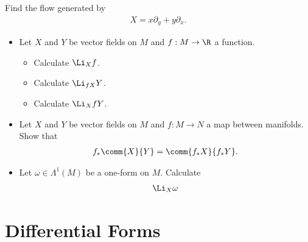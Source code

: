 \begin{Ebox}
  Find the flow generated by
  \begin{align}
    X = x\partial_y +y\partial_x.
  \end{align}
\end{Ebox}

\begin{Ebox}
  \begin{itemize}
  \item Let $X$ and $Y$ be vector fields on $M$ and $f:M\to\R$ a function.
    \begin{itemize}
    \item Calculate $\Li_{X}f$.
    \item Calculate $\Li_{fX}Y$.
    \item Calculate $\Li_{X}fY$.
    \end{itemize}
  \item  Let $X$ and $Y$ be vector fields on $M$ and $f:M\to N$ a map between manifolds. Show that
    \begin{align}
      f_*\comm{X}{Y} =\comm{f_*X}{f_*Y}.
    \end{align}
  \item Let $\omega\in\Lambda^1(M)$ be a one-form on $M$. Calculate
    \begin{align}
      \Li_X \omega
    \end{align}
  \end{itemize}
\end{Ebox}





\chapter{Differential Forms}

